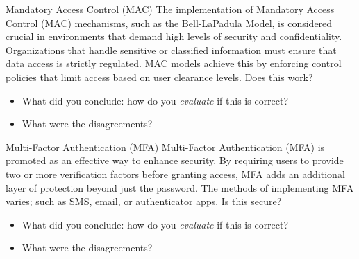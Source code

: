 \begin{frame}
  \begin{block}{Mandatory Access Control (MAC)}
    The implementation of Mandatory Access Control (MAC) mechanisms, such
    as the Bell-LaPadula Model, is considered crucial in environments that
    demand high levels of security and confidentiality. Organizations that
    handle sensitive or classified information must ensure that data access
    is strictly regulated. MAC models achieve this by enforcing control
    policies that limit access based on user clearance levels. Does this work?
  \end{block}

  \begin{question}
    \begin{itemize}
      \item What did you conclude: how do you \emph{evaluate} if this is 
        correct?
      \item What were the disagreements?
    \end{itemize}
  \end{question}
\end{frame}

\begin{frame}
  \begin{block}{Multi-Factor Authentication (MFA)}
    Multi-Factor Authentication (MFA) is promoted as an effective way to enhance 
    security. By requiring users to provide two or more verification factors before 
    granting access, MFA adds an additional layer of protection beyond just the 
    password. The methods of implementing MFA varies; such as SMS, email, or 
    authenticator apps. Is this secure?
  \end{block}

  \begin{question}
    \begin{itemize}
      \item What did you conclude: how do you \emph{evaluate} if this is 
        correct?
      \item What were the disagreements?
    \end{itemize}
  \end{question}
\end{frame}

